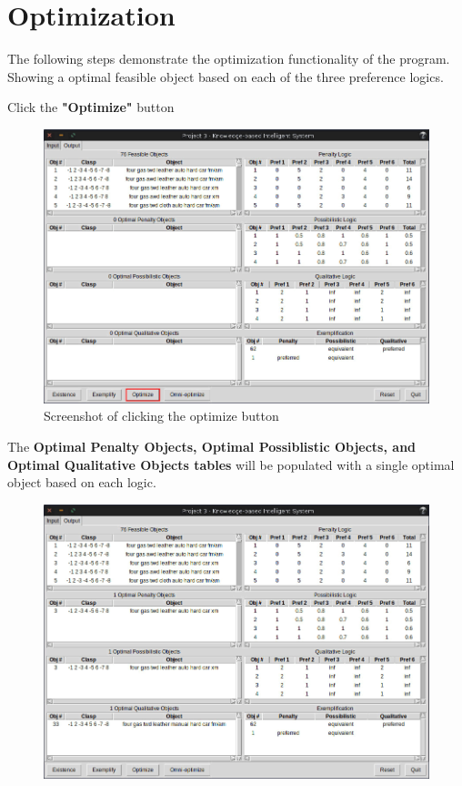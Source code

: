 \documentclass[12pt]{report}
\begin{document}
\newpage
\section{Optimization}
The following steps demonstrate the optimization functionality of the program. \\
Showing a optimal feasible object based on each of the three preference logics.\\

\begin{description}[leftmargin=4em]
\item [Step 1:]  Click the \textbf{"Optimize"} button
\begin{figure}[H]
\begin{center}
\includegraphics[scale=0.3,trim=1cm 1cm 1cm 1cm]{optimize}
\caption{Screenshot of clicking the optimize button}
\end{center}
\end{figure}
\vspace{-2.5em}
\item [Result:] The \textbf{Optimal Penalty Objects, Optimal Possiblistic Objects, and Optimal Qualitative Objects tables} will be populated with a single optimal object based on each logic.
\begin{figure}[H]
\begin{center}
\includegraphics[scale=0.3,trim=1cm 1cm 1cm 1cm]{post_optimize}

\end{center}
\end{figure}
\end{description}
\end{document}
